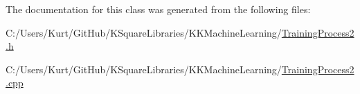 The documentation for this class was generated from the following files\+:\begin{DoxyCompactItemize}
\item 
C\+:/\+Users/\+Kurt/\+Git\+Hub/\+K\+Square\+Libraries/\+K\+K\+Machine\+Learning/\hyperlink{_training_process2_8h}{Training\+Process2.\+h}\item 
C\+:/\+Users/\+Kurt/\+Git\+Hub/\+K\+Square\+Libraries/\+K\+K\+Machine\+Learning/\hyperlink{_training_process2_8cpp}{Training\+Process2.\+cpp}\end{DoxyCompactItemize}

